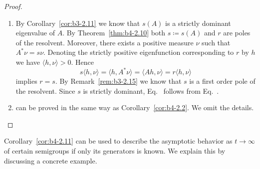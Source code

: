 \begin{proof}
	\begin{enumerate}[\upshape (i), wide, labelindent=.25em]
		\item 
		By Corollary~\ref{cor:b3-2.11} we know that $s(A)$ is a strictly dominant eigenvalue of\/ $A$. 
        By Theorem~\ref{thm:b4-2.10} both $s  \coloneq  s(A)$ and $r$ are poles of the resolvent. 
        Moreover, there exists a positive measure $\nu$ such that $A^*\nu = s\nu$. 
        Denoting the strictly positive eigenfunction corresponding to $r$ by $h$ we have $\langle h,\nu \rangle > 0$. 
        Hence 
%
\[
	s\langle h,\nu \rangle = \langle h,A^*\nu \rangle = \langle Ah,\nu \rangle = r\langle h,\nu \rangle
\]
%
implies $r = s$. 
By Remark~\ref{rem:b3-2.15} we know that $s$ is a first order pole of the resolvent. Since $s$ is strictly dominant, Eq.~ follows from Eq.~.

\item 
can be proved in the same way as Corollary~\ref{cor:b4-2.2}. 
We omit the details.
	\end{enumerate}
\end{proof}
Corollary~\ref{cor:b4-2.11} can be used to describe the asymptotic behavior as $t \to \infty$ of certain semigroups if only its generators is known. 
We explain this by discussing a concrete example.
